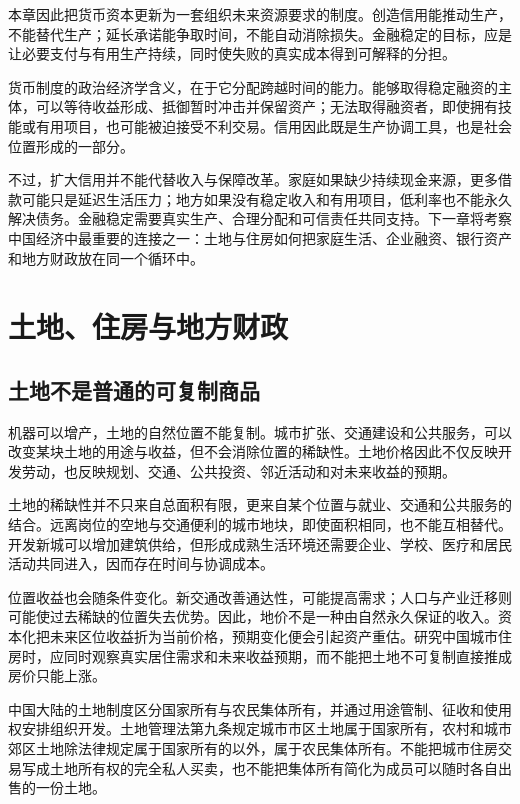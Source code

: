 \documentclass[UTF8,fontset=fandol,zihao=-4,oneside,openany]{ctexbook}
\begin{document}
本章因此把货币资本更新为一套组织未来资源要求的制度。创造信用能推动生产，不能替代生产；延长承诺能争取时间，不能自动消除损失。金融稳定的目标，应是让必要支付与有用生产持续，同时使失败的真实成本得到可解释的分担。

\label{arg:P115}
货币制度的政治经济学含义，在于它分配跨越时间的能力。能够取得稳定融资的主体，可以等待收益形成、抵御暂时冲击并保留资产；无法取得融资者，即使拥有技能或有用项目，也可能被迫接受不利交易。信用因此既是生产协调工具，也是社会位置形成的一部分。

不过，扩大信用并不能代替收入与保障改革。家庭如果缺少持续现金来源，更多借款可能只是延迟生活压力；地方如果没有稳定收入和有用项目，低利率也不能永久解决债务。金融稳定需要真实生产、合理分配和可信责任共同支持。下一章将考察中国经济中最重要的连接之一：土地与住房如何把家庭生活、企业融资、银行资产和地方财政放在同一个循环中。


\chapter{土地、住房与地方财政}
\section{土地不是普通的可复制商品}
机器可以增产，土地的自然位置不能复制。城市扩张、交通建设和公共服务，可以改变某块土地的用途与收益，但不会消除位置的稀缺性。土地价格因此不仅反映开发劳动，也反映规划、交通、公共投资、邻近活动和对未来收益的预期。

\label{arg:P116}
土地的稀缺性并不只来自总面积有限，更来自某个位置与就业、交通和公共服务的结合。远离岗位的空地与交通便利的城市地块，即使面积相同，也不能互相替代。开发新城可以增加建筑供给，但形成成熟生活环境还需要企业、学校、医疗和居民活动共同进入，因而存在时间与协调成本。

位置收益也会随条件变化。新交通改善通达性，可能提高需求；人口与产业迁移则可能使过去稀缺的位置失去优势。因此，地价不是一种由自然永久保证的收入。资本化把未来区位收益折为当前价格，预期变化便会引起资产重估。研究中国城市住房时，应同时观察真实居住需求和未来收益预期，而不能把土地不可复制直接推成房价只能上涨。

中国大陆的土地制度区分国家所有与农民集体所有，并通过用途管制、征收和使用权安排组织开发。土地管理法第九条规定城市市区土地属于国家所有，农村和城市郊区土地除法律规定属于国家所有的以外，属于农民集体所有。不能把城市住房交易写成土地所有权的完全私人买卖，也不能把集体所有简化为成员可以随时各自出售的一份土地。\cite{LandLaw}
\end{document}
